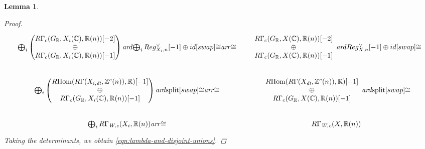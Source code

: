 \documentclass[10pt,a4paper,oneside]{article}
\DeclareMathOperator{\Hom}{Hom}
\newcommand{\CC}{\mathbb{C}}
\newcommand{\RR}{\mathbb{R}}
\newcommand{\ZZ}{\mathbb{Z}}
\newcommand{\ar}{\text{\it ar}}
\newcommand{\et}{\text{\it \'{e}t}}
\newcommand{\Wc}{\text{\it W,c}}
\newcommand{\RHom}{R\!\Hom}
\theoremstyle{myplain}
\newtheorem{lemma}[theorem]{Lemma}
\theoremstyle{mydefinition}
\numberwithin{equation}{section}
\begin{document}
\begin{lemma}
\begin{proof}
    \[ \begin{tikzcd}[column sep=1.25em]
        \bigoplus_i \left(\!\!\!\begin{array}{c} R\Gamma_c (G_\RR, X_i (\CC), \RR (n)) [-2] \\ \oplus \\ R\Gamma_c (G_\RR, X_i (\CC), \RR (n)) [-1] \end{array}\!\!\!\right) \ar{d}{\bigoplus_i Reg_{X_i,n}^\vee [-1] \oplus id}[swap]{\cong} \ar{r}{\cong} & \begin{array}{c} R\Gamma_c (G_\RR, X (\CC), \RR (n)) [-2] \\ \oplus \\ R\Gamma_c (G_\RR, X (\CC), \RR (n)) [-1] \end{array} \ar{d}{Reg_{X,n}^\vee [-1] \oplus id}[swap]{\cong} \\
        \bigoplus_i \left(\!\!\!\begin{array}{c} \RHom (R\Gamma (X_{i,\et}, \ZZ^c (n)), \RR) [-1] \\ \oplus \\ R\Gamma_c (G_\RR, X_i (\CC), \RR (n)) [-1] \end{array}\!\!\!\right) \ar{d}{\text{split}}[swap]{\cong} \ar{r}{\cong} & \begin{array}{c} \RHom (R\Gamma (X_\et, \ZZ^c (n)), \RR) [-1] \\ \oplus \\ R\Gamma_c (G_\RR, X (\CC), \RR (n)) [-1] \end{array} \ar{d}{\text{split}}[swap]{\cong} \\
        \bigoplus_i R\Gamma_\Wc (X_i, \RR (n)) \ar{r}{\cong} & R\Gamma_\Wc (X, \RR (n))
      \end{tikzcd} \]
    Taking the determinants, we obtain \eqref{eqn:lambda-and-disjoint-unions}.
  \end{proof}
\end{lemma}
\end{document}
